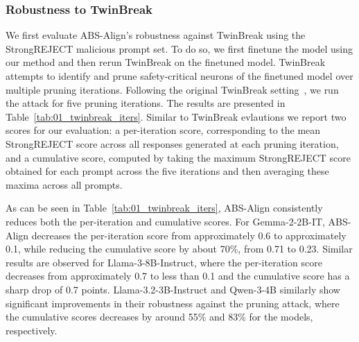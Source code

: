 
\subsubsection{Robustness to TwinBreak}
\label{subsubsec:robustness_pruning}


We first evaluate ABS-Align's robustness against TwinBreak using the StrongREJECT malicious prompt set. To do so, we first finetune the model using our method and then rerun TwinBreak on the finetuned model. TwinBreak attempts to identify and prune safety-critical neurons of the finetuned model over multiple pruning iterations. Following the original TwinBreak setting~\cite{twinbreak}, we run the attack for five pruning iterations. The results are presented in Table~\ref{tab:01_twinbreak_iters}. Similar to TwinBreak evlautions we report two scores for our evaluation: a per-iteration score, corresponding to the mean StrongREJECT score across all responses generated at each pruning iteration, and a cumulative score, computed by taking the maximum StrongREJECT score obtained for each prompt across the five iterations and then averaging these maxima across all prompts.

As can be seen in Table~\ref{tab:01_twinbreak_iters}, ABS-Align consistently reduces both the per-iteration and cumulative scores. For Gemma-2-2B-IT, ABS-Align decreases the per-iteration score from approximately 0.6 to approximately 0.1, while reducing the cumulative score by about 70\%, from 0.71 to 0.23. Similar results are observed for Llama-3-8B-Instruct, where the per-iteration score decreases from approximately 0.7 to less than 0.1 and the cumulative score has a sharp drop of 0.7 points. Llama-3.2-3B-Instruct and Qwen-3-4B similarly show significant improvements in their robustness against the pruning attack, where  the cumulative scores decreases by around 55\% and 83\% for the models, respectively.

